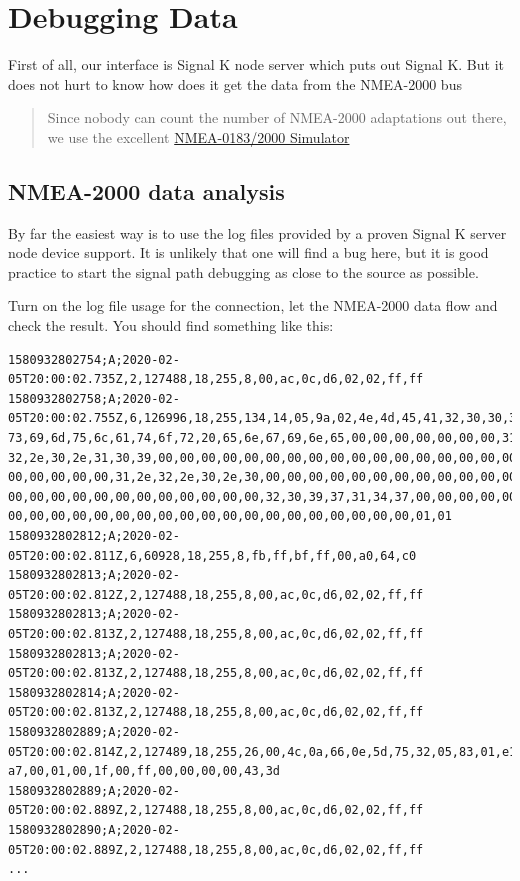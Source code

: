 \documentclass[11pt]{article}
\begin{document}
    \hypertarget{debugging-data}{%
\section{Debugging Data}\label{debugging-data}}

    First of all, our interface is Signal K node server which puts out
Signal K. But it does not hurt to know how does it get the data from the
NMEA-2000 bus

    \begin{quote}
Since nobody can count the number of NMEA-2000 adaptations out there, we
use the excellent
\href{https://opencpn.org/wiki/dokuwiki/doku.php?id=opencpn:supplementary_software:signalk:a6\#how_to_use_a_nmea-simulator_to_stream_nmea-0183_and_nmea-2000_data}{NMEA-0183/2000
Simulator}
\end{quote}

    \hypertarget{nmea-2000-data-analysis}{%
\subsection{NMEA-2000 data analysis}\label{nmea-2000-data-analysis}}

    By far the easiest way is to use the log files provided by a proven
Signal K server node device support. It is unlikely that one will find a
bug here, but it is good practice to start the signal path debugging as
close to the source as possible.

    Turn on the log file usage for the connection, let the NMEA-2000 data
flow and check the result. You should find something like this:

    \begin{verbatim}
1580932802754;A;2020-02-05T20:00:02.735Z,2,127488,18,255,8,00,ac,0c,d6,02,02,ff,ff
1580932802758;A;2020-02-05T20:00:02.755Z,6,126996,18,255,134,14,05,9a,02,4e,4d,45,41,32,30,30,30,20,
73,69,6d,75,6c,61,74,6f,72,20,65,6e,67,69,6e,65,00,00,00,00,00,00,00,31,2e,
32,2e,30,2e,31,30,39,00,00,00,00,00,00,00,00,00,00,00,00,00,00,00,00,00,00,
00,00,00,00,00,31,2e,32,2e,30,2e,30,00,00,00,00,00,00,00,00,00,00,00,00,00,
00,00,00,00,00,00,00,00,00,00,00,00,32,30,39,37,31,34,37,00,00,00,00,00,00,
00,00,00,00,00,00,00,00,00,00,00,00,00,00,00,00,00,00,00,01,01
1580932802812;A;2020-02-05T20:00:02.811Z,6,60928,18,255,8,fb,ff,bf,ff,00,a0,64,c0
1580932802813;A;2020-02-05T20:00:02.812Z,2,127488,18,255,8,00,ac,0c,d6,02,02,ff,ff
1580932802813;A;2020-02-05T20:00:02.813Z,2,127488,18,255,8,00,ac,0c,d6,02,02,ff,ff
1580932802813;A;2020-02-05T20:00:02.813Z,2,127488,18,255,8,00,ac,0c,d6,02,02,ff,ff
1580932802814;A;2020-02-05T20:00:02.813Z,2,127488,18,255,8,00,ac,0c,d6,02,02,ff,ff
1580932802889;A;2020-02-05T20:00:02.814Z,2,127489,18,255,26,00,4c,0a,66,0e,5d,75,32,05,83,01,e1,d9,
a7,00,01,00,1f,00,ff,00,00,00,00,43,3d
1580932802889;A;2020-02-05T20:00:02.889Z,2,127488,18,255,8,00,ac,0c,d6,02,02,ff,ff
1580932802890;A;2020-02-05T20:00:02.889Z,2,127488,18,255,8,00,ac,0c,d6,02,02,ff,ff
...
\end{verbatim}
\end{document}
